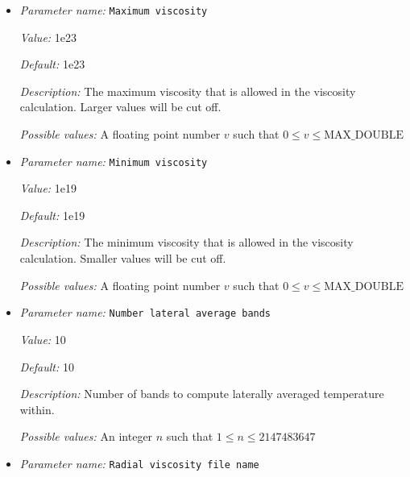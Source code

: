 \begin{itemize}
{\it Possible values:} A floating point number $v$ such that $0 \leq v \leq \text{MAX\_DOUBLE}$
\item {\it Parameter name:} {\tt Maximum viscosity}
\label{parameters:Material model/Steinberger model/Maximum viscosity}
\label{parameters:Material_20model/Steinberger_20model/Maximum_20viscosity}


{\it Value:} 1e23


{\it Default:} 1e23


{\it Description:} The maximum viscosity that is allowed in the viscosity calculation. Larger values will be cut off.


{\it Possible values:} A floating point number $v$ such that $0 \leq v \leq \text{MAX\_DOUBLE}$
\item {\it Parameter name:} {\tt Minimum viscosity}
\label{parameters:Material model/Steinberger model/Minimum viscosity}
\label{parameters:Material_20model/Steinberger_20model/Minimum_20viscosity}


{\it Value:} 1e19


{\it Default:} 1e19


{\it Description:} The minimum viscosity that is allowed in the viscosity calculation. Smaller values will be cut off.


{\it Possible values:} A floating point number $v$ such that $0 \leq v \leq \text{MAX\_DOUBLE}$
\item {\it Parameter name:} {\tt Number lateral average bands}
\label{parameters:Material model/Steinberger model/Number lateral average bands}
\label{parameters:Material_20model/Steinberger_20model/Number_20lateral_20average_20bands}


{\it Value:} 10


{\it Default:} 10


{\it Description:} Number of bands to compute laterally averaged temperature within.


{\it Possible values:} An integer $n$ such that $1\leq n \leq 2147483647$
\item {\it Parameter name:} {\tt Radial viscosity file name}
\label{parameters:Material model/Steinberger model/Radial viscosity file name}
\label{parameters:Material_20model/Steinberger_20model/Radial_20viscosity_20file_20name}



\end{itemize}
